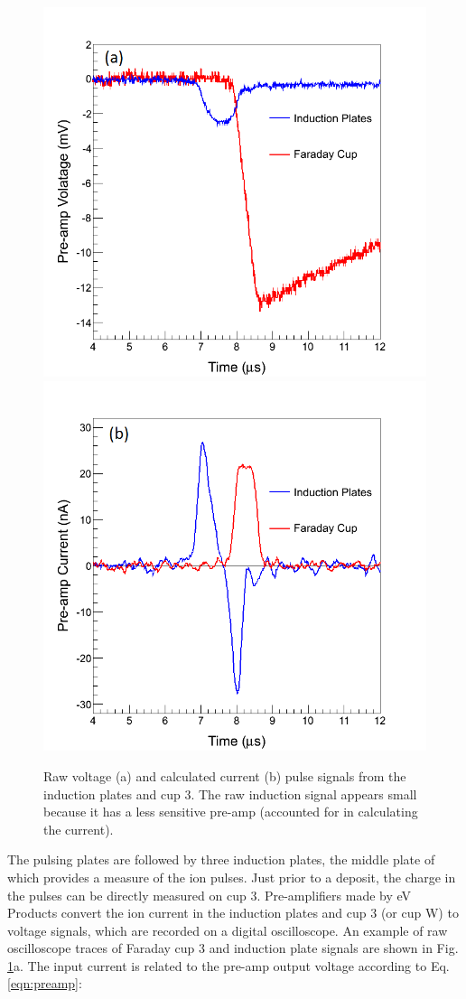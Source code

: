 \begin{figure} %
                \includegraphics[width=.49\textwidth]{figures/pulse_ind_cup3_raw.png}
                \includegraphics[width=.49\textwidth]{figures/pulse_ind_cup3_shaped.png}
                \caption{Raw voltage (a) and calculated current (b) pulse signals from the induction plates and cup 3.  The raw induction signal appears small because it has a less sensitive pre-amp (accounted for in calculating the current).}
        \label{fig:pulse_raw_shaped}
\end{figure}

The pulsing plates are followed by three induction plates, the middle plate of which provides a measure of the ion pulses.  Just prior to a deposit, the charge in the pulses can be directly measured on cup 3.  Pre-amplifiers made by eV Products convert the ion current in the induction plates and cup 3 (or cup W) to voltage signals, which are recorded on a digital oscilloscope.  An example of raw oscilloscope traces of Faraday cup 3 and induction plate signals are shown in Fig. \ref{fig:pulse_raw_shaped}a.  The input current is related to the pre-amp output voltage according to Eq. \ref{eqn:preamp}:

